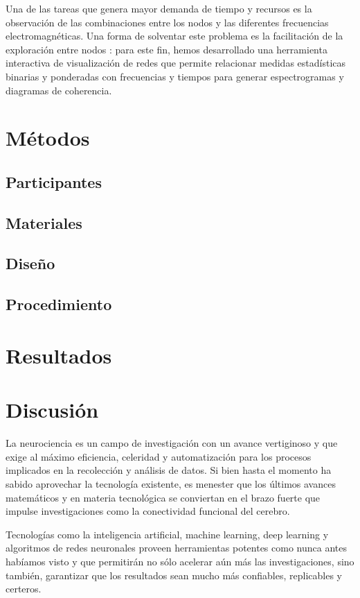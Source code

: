 \documentclass[jou]{apa6}
\begin{document}
Una de las tareas que genera mayor demanda de tiempo y recursos es la observación de las combinaciones entre los nodos
y las diferentes frecuencias electromagnéticas. Una forma de solventar este problema es la facilitación de la 
exploración entre nodos \parencite{Massimini2228}: para este fin, hemos desarrollado una herramienta interactiva 
de visualización de redes que permite relacionar medidas estadísticas binarias y ponderadas con frecuencias y 
tiempos para generar espectrogramas y diagramas de coherencia.

\section{Métodos}
\subsection{Participantes}
\subsection{Materiales}
\subsection{Diseño}
\subsection{Procedimiento}

\section{Resultados}

\section{Discusión}
La neurociencia es un campo de investigación con un avance vertiginoso y que exige al máximo eficiencia, celeridad
y automatización para los procesos implicados en la recolección y análisis de datos. Si bien hasta el momento ha 
sabido aprovechar la tecnología existente, es menester que los últimos avances matemáticos y en materia tecnológica 
se conviertan en el brazo fuerte que impulse investigaciones como la conectividad funcional del cerebro.

Tecnologías como la inteligencia artificial, machine learning, deep learning y algoritmos de redes neuronales proveen 
herramientas potentes como nunca antes habíamos visto y que permitirán no sólo acelerar aún más las investigaciones, 
sino también, garantizar que los resultados sean mucho más confiables, replicables y certeros.
\end{document}
